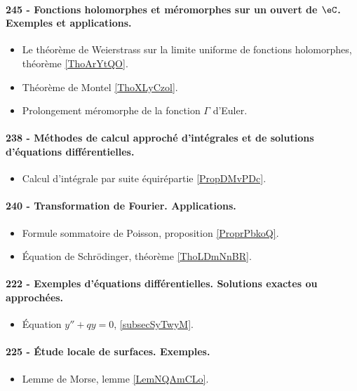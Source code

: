 \paragraph{245 - Fonctions holomorphes et méromorphes sur un ouvert de \( \eC\). Exemples et applications.}
\begin{itemize}
    \item Le théorème de Weierstrass sur la limite uniforme de fonctions holomorphes, théorème \ref{ThoArYtQO}.
    \item Théorème de Montel \ref{ThoXLyCzol}.
    \item Prolongement méromorphe de la fonction \( \Gamma\) d'Euler.
\end{itemize}
\paragraph{238 - Méthodes de calcul approché d'intégrales et de solutions d’équations différentielles.}
\begin{itemize}
    \item Calcul d'intégrale par suite équirépartie \ref{PropDMvPDc}.
\end{itemize}
\paragraph{240 - Transformation de Fourier. Applications.}
\begin{itemize}
    \item Formule sommatoire de Poisson, proposition \ref{ProprPbkoQ}.
    \item Équation de Schrödinger, théorème \ref{ThoLDmNnBR}.
\end{itemize}
\paragraph{222 - Exemples d’équations différentielles. Solutions exactes ou approchées.}
\begin{itemize}
    \item Équation \( y''+qy=0\), \ref{subsecSyTwyM}.
\end{itemize}
\paragraph{225 - Étude locale de surfaces. Exemples.}
\begin{itemize}
    \item Lemme de Morse, lemme \ref{LemNQAmCLo}.
\end{itemize}
